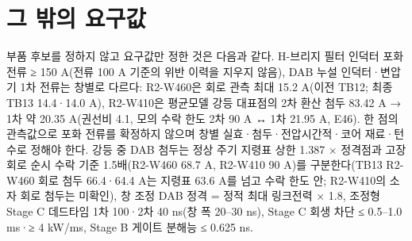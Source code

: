 \section{그 밖의 요구값}

부품 후보를 정하지 않고 요구값만 정한 것은 다음과 같다. H-브리지 필터 인덕터 포화 전류 ≥ 150 A(전류 100 A 기준의 위반 이력을 지우지 않음), DAB 누설 인덕터·변압기 1차 전류는 창별로 다르다: R2-W460은 회로 관측 최대 15.2 A(이전 TB12; 최종 TB13 14.4·14.0 A), R2-W410은 평균모델 강등 대표점의 2차 환산 첨두 83.42 A → 1차 약 20.35 A(권선비 4.1, 모의 수락 한도 2차 90 A ↔ 1차 21.95 A, E46). 한 점의 관측값으로 포화 전류를 확정하지 않으며 창별 실효·첨두·전압시간적·코어 재료·턴수로 정해야 한다. 강등 중 DAB 첨두는 정상 주기 지령표 상한 1.387 × 정격점과 고장 회로 순시 수락 기준 1.5배(R2-W460 68.7 A, R2-W410 90 A)를 구분한다(TB13 R2-W460 회로 첨두 66.4·64.4 A는 지령표 63.6 A를 넘고 수락 한도 안; R2-W410의 소자 회로 첨두는 미확인), 창 조정 DAB 정격 = 정적 최대 링크전력 × 1.8, 조정형 Stage C 데드타임 1차 100·2차 40 ns(창 폭 20–30 ns), Stage C 회생 차단 ≤ 0.5–1.0 ms·≥ 4 kW/ms, Stage B 게이트 분해능 ≤ 0.625 ns.
